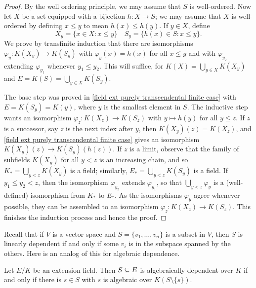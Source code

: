 \begin{proof}
By the well ordering principle, we may assume that $S$ is well-ordered. Now let $X$ be a set equipped with a bijection $h:X\to S$; we may assume that $X$ is well-ordered by defining $x\leq y$ to mean $h(x)\leq h(y)$. If $y\in X$, define
\[X_y=\{x\in X:x\leq y\}\quad S_y=\{h(x)\in S:x\leq y\}.\]
We prove by transfinite induction that there are isomorphisms $\varphi_y:K(X_y)\to K(S_y)$ with $\varphi_y(x)=h(x)$ for all $x\leq y$ and with $\varphi_{y_2}$ extending $\varphi_{y_1}$ whenever $y_1\leq y_2$. This will suffice, for $K(X)=\bigcup_{y\in X}K(X_y)$ and $E=K(S)=\bigcup_{y\in X}K(S_y)$.\par
The base step was proved in \cref{field ext purely transcendental finite case} with $E=K(S_y)=K(y)$, where $y$ is the smallest element in $S$. The inductive step wants an isomorphism $\varphi_z:K(X_z)\to K(S_z)$ with $y\mapsto h(y)$ for all $y\leq z$. If $z$ is a successor, say $z$ is the next index after $y$, then $K(X_y)(z)=K(X_z)$, and \cref{field ext purely transcendental finite case} gives an isomorphism $K(X_y)(z)\to K(S_y)(h(z))$. If $z$ is a limit, observe that the family of subfields $K(X_y)$ for all $y<z$ is an increasing chain, and so $K_*=\bigcup_{y<z}K(X_y)$ is a field; similarly, $E_*=\bigcup_{y< z}K(S_y)$ is a field. If $y_1\leq y_2<z$, then the isomorphism $\varphi_{y_2}$ extends $\varphi_{y_1}$, so that $\bigcup_{y<z}\varphi_y$ is a (well-defined) isomorphism from $K_*$ to $E_*$. As the isomorphisms $\varphi_y$ agree whenever possible, they can be assembled to an isomorphism $\varphi_z:K(X_z)\to K(S_z)$. This finishes the induction process and hence the proof.
\end{proof}
Recall that if $V$ is a vector space and $S=\{v_1,\dots,v_n\}$ is a subset in $V$, then $S$ is linearly dependent if and only if some $v_i$ is in the subspace spanned by the others. Here is an analog of this for algebraic dependence.
\begin{proposition}\label{field ext algebraically dependent iff algebraic on other}
Let $E/K$ be an extension field. Then $S\subseteq E$ is algebraically dependent over $K$ if and only if there is $s\in S$ with $s$ is algebraic over $K(S\setminus\{s\})$.
\end{proposition}
